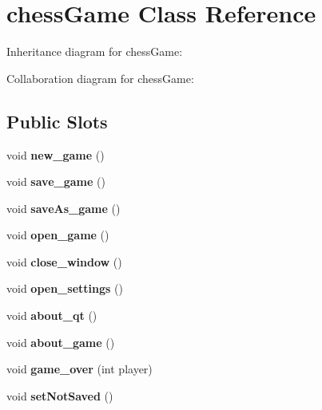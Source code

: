 \hypertarget{classchessGame}{}\section{chess\+Game Class Reference}
\label{classchessGame}


Inheritance diagram for chess\+Game\+:


Collaboration diagram for chess\+Game\+:
\subsection*{Public Slots}
\begin{DoxyCompactItemize}
\item 
\mbox{\label{classchessGame_a230eb38f254315b36cd363d9934d4945}} 
void {\bfseries new\+\_\+game} ()
\item 
\mbox{\label{classchessGame_a5aa2f3514c1ef832a80ab5a10288c20e}} 
void {\bfseries save\+\_\+game} ()
\item 
\mbox{\label{classchessGame_aff9965791d6a11efb08d6c483db6371b}} 
void {\bfseries save\+As\+\_\+game} ()
\item 
\mbox{\label{classchessGame_a5e8b9a01b5d091579e7f13fe742c85b1}} 
void {\bfseries open\+\_\+game} ()
\item 
\mbox{\label{classchessGame_a0fec48a8caa52eca9bb109b1ab7d5aa9}} 
void {\bfseries close\+\_\+window} ()
\item 
\mbox{\label{classchessGame_af4636d3a148b8e910ac093bf419fbac7}} 
void {\bfseries open\+\_\+settings} ()
\item 
\mbox{\label{classchessGame_a00156441ff76452fd40b572683ea99b9}} 
void {\bfseries about\+\_\+qt} ()
\item 
\mbox{\label{classchessGame_a86245fb64348f772be40001d4f063f03}} 
void {\bfseries about\+\_\+game} ()
\item 
\mbox{\label{classchessGame_a209b5541bf8d34b7f9ff0c48972bf972}} 
void {\bfseries game\+\_\+over} (int player)
\item 
\mbox{\label{classchessGame_aa53efb2e6476d9a7445e7a166ebe023b}} 
void {\bfseries set\+Not\+Saved} ()
\end{DoxyCompactItemize}
